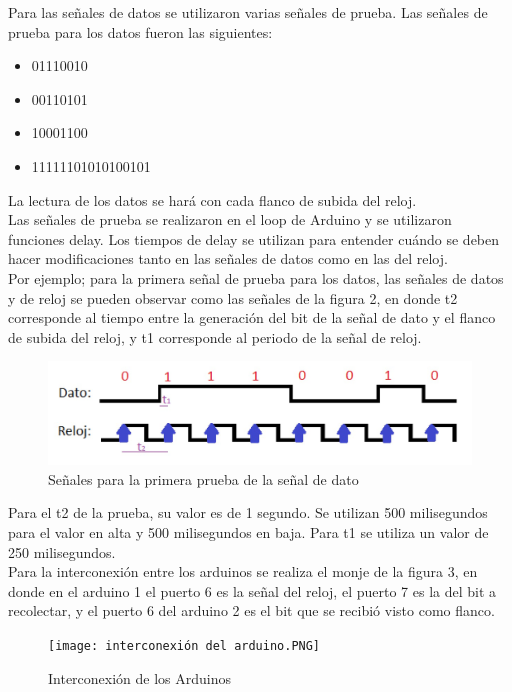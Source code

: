 \documentclass{article}
\begin{document}
Para las señales de datos se utilizaron varias señales de prueba. Las señales de prueba para los datos fueron las siguientes:
\begin{itemize}
\item 01110010
\item 00110101
\item 10001100
\item 11111101010100101
\end{itemize}

La lectura de los datos se hará con cada flanco de subida del reloj.\\

Las señales de prueba se realizaron en el loop de Arduino y se utilizaron funciones delay. Los tiempos de delay se utilizan para entender cuándo se deben hacer modificaciones tanto en las señales de datos como en las del reloj.\\

Por ejemplo; para la primera señal de prueba para los datos, las señales de datos y de reloj se pueden observar como las señales de la figura 2, en donde t2 corresponde al tiempo entre la generación del bit de la señal de dato y el flanco de subida del reloj, y t1 corresponde al periodo de la señal de reloj.\\

\begin{figure}[h]
\includegraphics[width=12cm]{Prueba_datos_y_clock.jpeg}
\centering
\caption{Señales para la primera prueba de la señal de dato}
\label{fig:Prueba_datos_y_clock.jpeg}
\end{figure}

Para el t2 de la prueba, su valor es de 1 segundo. Se utilizan 500 milisegundos para el valor en alta y 500 milisegundos en baja. Para t1 se utiliza un valor de 250 milisegundos.\\


Para la interconexión entre los arduinos se realiza el monje de la figura 3, en donde en el arduino 1 el puerto 6 es la señal del reloj, el puerto 7 es la del bit a recolectar, y el puerto 6 del arduino 2 es el bit que se recibió visto como flanco.


\begin{figure}[h]
\texttt{[image: interconexión del arduino.PNG]}
\centering
\caption{Interconexión de los Arduinos}
\label{fig:interconexión del arduino.PNG}
\end{figure}
\end{document}
